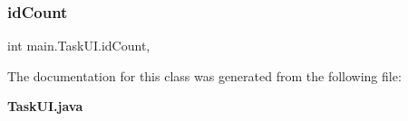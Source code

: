 \mbox{\label{classmain_1_1_task_u_i_ac561a3128768f58d8c9ddeadc2edddf3}} 
\subsubsection{id\+Count}
{\footnotesize\ttfamily int main.\+Task\+U\+I.\+id\+Count\hspace{0.3cm}{\ttfamily [static]}, {\ttfamily [private]}}



The documentation for this class was generated from the following file\+:\begin{DoxyCompactItemize}
\item 
\textbf{ Task\+U\+I.\+java}\end{DoxyCompactItemize}

